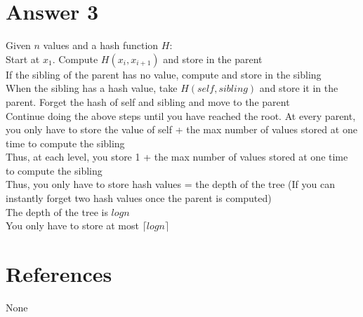 \documentclass[11pt]{article}
\theoremstyle{definition}
\begin{document}
\section*{Answer 3}
Given $n$ values and a hash function $H$:\\
Start at $x_1$.  
Compute $H(x_i,x_{i+1})$ and store in the parent\\
If the sibling of the parent has no value, compute and store in the sibling\\
When the sibling has a hash value, take $H(self, sibling)$ and store it in the parent.  Forget the hash of self and sibling and move to the parent\\
Continue doing the above steps until you have reached the root.
At every parent, you only have to store the value of self + the max number of values stored at one time to compute the sibling\\
Thus, at each level, you store 1 + the max number of values stored at one time to compute the sibling\\
Thus, you only have to store hash values = the depth of the tree (If you can instantly forget two hash values once the parent is computed)\\
The depth of the tree is $log n$\\
You only have to store at most $\lceil log n \rceil$\\




\noindent\hrulefill


\section*{References}

None
\end{document}
